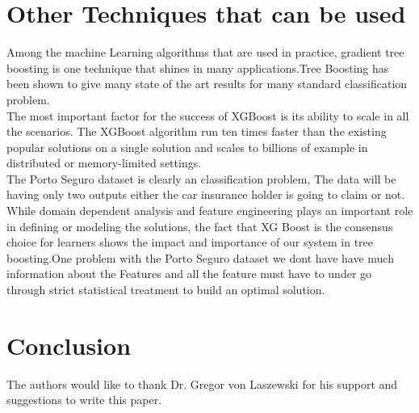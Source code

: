 \section{Other Techniques that can be used}
Among the machine Learning algorithms that are used in practice, gradient tree boosting is one technique that shines in many applications.Tree Boosting has been shown to give many state of the art results for many standard classification problem.
\\
The most important factor for the success of XGBoost is its ability to scale in all the scenarios. The XGBoost algorithm run ten times faster than the existing popular solutions on a single solution and scales to billions of example in distributed or memory-limited settings.
\\
The Porto Seguro dataset is clearly an classification problem, The data will be having only two outputs either the car insurance holder is going to claim or not.
\\
While domain dependent analysis and feature engineering plays an important role in defining or modeling the solutions, the fact that XG Boost is the consensus choice for learners shows the impact and importance of our system in tree boosting.One problem with the Porto Seguro dataset we dont have have much information about the Features and all the feature must have to under go through strict statistical treatment to build an optimal solution.

\section{Conclusion}


\begin{acks}

  The authors would like to thank Dr. Gregor von Laszewski for his
  support and suggestions to write this paper.

\end{acks}


 
